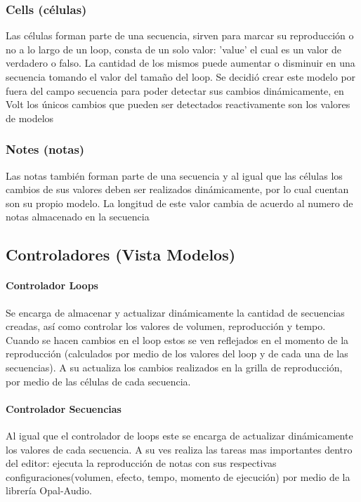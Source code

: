 \subsubsection{Cells (células)}
Las células forman parte de una secuencia, sirven para marcar su reproducción o no
a lo largo de un loop, consta de un solo valor: 'value' el cual es un valor de
verdadero o falso. La cantidad de los mismos puede aumentar o disminuir en una
secuencia tomando el valor del tamaño del loop. Se decidió crear este modelo por
fuera del campo secuencia para poder detectar sus cambios dinámicamente, en Volt
los únicos cambios que pueden ser detectados reactivamente son los valores de modelos

\subsubsection{Notes (notas)}
Las notas también forman parte de una secuencia y al igual que las células
los cambios de sus valores deben ser realizados dinámicamente, por lo cual
cuentan son su propio modelo. La longitud de este valor cambia de acuerdo
al numero de notas almacenado en la secuencia

\subsection{Controladores (Vista Modelos)}
\paragraph{Controlador Loops}
Se encarga de almacenar y actualizar dinámicamente la cantidad de secuencias creadas,
así como controlar los valores de volumen, reproducción y tempo.
Cuando se hacen cambios en el loop estos se ven reflejados en el momento de la reproducción
(calculados por medio de los valores del loop y de cada una de las secuencias). A su
actualiza los cambios realizados en la grilla de reproducción, por medio de las células
de cada secuencia.

\paragraph{Controlador Secuencias}
Al igual que el controlador de loops este se encarga de actualizar dinámicamente los
valores de cada secuencia. A su ves realiza las tareas mas importantes dentro del editor:
ejecuta la reproducción de notas con sus respectivas configuraciones(volumen, efecto, tempo,
momento de ejecución) por medio de la librería Opal-Audio.

